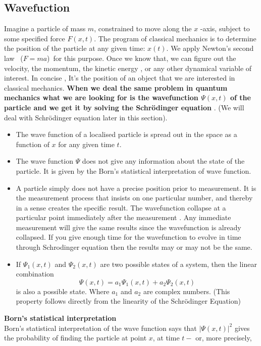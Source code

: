 \subsection{Wavefuction}
Imagine a particle of mass $m$, constrained to move along the $x$ -axis, subject to some specified force $F(x, t)$.  The program of classical mechanics is to determine the position of the particle at any given time: $x(t) .$ We apply Newton's second law \ ($F=ma$)\ for this purpose.  Once we know that, we can figure out the velocity, the momentum, the kinetic energy , or any other dynamical variable of interest. In concise , It's the position of an object that we are interested in classical mechanics. \textbf{When we deal the same  problem in quantum mechanics what we are looking for is the wavefunction  $\Psi(x,t) $ of the particle and we get it by solving the Schrödinger equation	}. (We will deal with Schrödinger equation later in this section).
\begin{itemize}
	
	\item The wave function of a localised particle is spread out in the space as a function of $x$ for any given time $t$.
	\item The wave function  $\Psi$ does not give any information about the state of the particle. It is given by the Born's statistical interpretation of wave function.
	
	\item A particle simply does not have a precise position prior to measurement. It is the measurement process that insists on one particular number, and thereby in a sense creates the specific result. The wavefunction collapse at a particular point immediately after the measurement . Any immediate measurement will give the same results since the wavefunction is already collapsed. If you give enough time for the wavefunction to evolve in time through Schrodinger equation then the results may or may not be the same.
	\item If $\Psi_{1}(x,t)$ and $\Psi_{2}(x,t)$ are two possible states of a system, then the linear combination $$\Psi(x,t)=a_1 \Psi_{1}(x,t) +a_2 \Psi_{2}(x,t)$$ is also a possible state. Where $a_1$ and $a_2$ are complex numbers. (This property follows directly from the linearity of the Schrödinger Equation)
\end{itemize}
\textbf{Born's statistical interpretation }\\ Born's statistical interpretation of the wave function  says that $|\Psi(x, t)|^{2}$ gives the probability of finding the particle at point $x$, at time $t-$ or, more precisely,

